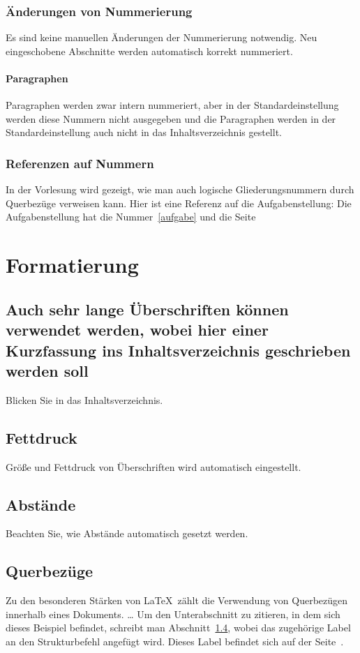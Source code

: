 \documentclass[a4paper, 12pt]{article} %
\begin{document}
\subsubsection{Änderungen von Nummerierung}
Es sind keine manuellen Änderungen der Nummerierung notwendig. 
Neu eingeschobene Abschnitte werden automatisch korrekt nummeriert.

\paragraph{Paragraphen} Paragraphen werden zwar intern nummeriert, aber in der
Standardeinstellung werden diese Nummern nicht ausgegeben und die 
Paragraphen werden in der Standardeinstellung auch nicht in das 
Inhaltsverzeichnis gestellt.

\subsubsection{Referenzen auf Nummern}
In der Vorlesung wird gezeigt, wie man auch logische Gliederungsnummern 
durch Querbezüge verweisen kann. Hier ist eine Referenz auf die Aufgabenstellung:
Die Aufgabenstellung hat die Nummer~\ref{aufgabe} und die Seite~\pageref{aufgabe}

\section{Formatierung}
\subsection[Lange Überschriften]{Auch sehr lange Überschriften können verwendet werden, wobei hier
einer Kurzfassung ins Inhaltsverzeichnis geschrieben werden soll}
Blicken Sie in das Inhaltsverzeichnis.

\subsection{Fettdruck}
Größe und Fettdruck von Überschriften wird automatisch eingestellt.

\subsection{Abstände}
Beachten Sie, wie Abstände automatisch gesetzt werden.

\subsection{Querbezüge} \label{subsec:referenzen}
Zu den besonderen Stärken von \LaTeX\ zählt die Verwendung von
Querbezügen innerhalb eines Dokuments.
\dots
Um den Unterabschnitt zu zitieren, in dem sich dieses Beispiel
befindet, schreibt man Abschnitt~\ref{subsec:referenzen}, wobei
das zugehörige Label an den Strukturbefehl angefügt wird.
Dieses Label befindet sich auf der Seite~\pageref{subsec:referenzen}.
\end{document}
